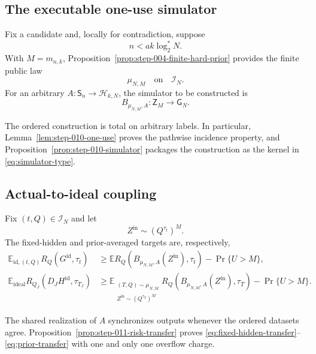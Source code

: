 \subsection{The executable one-use simulator}\label{app:step-010}
Fix a candidate and, locally for contradiction, suppose
\begin{equation}
n<ak\log_2^*N.
\tag{2}\label{eq:local-negation}
\end{equation}
With $M=m_{n,k}$, Proposition~\ref{prop:step-004-finite-hard-prior}
provides the finite public law
\begin{equation}
\mu_{N,M}\quad\text{on}\quad\mathcal I_N.
\tag{3}\label{eq:public-prior}
\end{equation}
For an arbitrary $A:\mathsf S_n\to\mathcal H_{k,N}$, the simulator to be
constructed is
\begin{equation}
B_{\mu_{N,M},A}:\mathsf Z_M\longrightarrow\mathsf G_N.
\tag{5}\label{eq:simulator-type}
\end{equation}

The ordered construction is total on arbitrary labels.  In particular,
Lemma~\ref{lem:step-010-one-use} proves the pathwise incidence property,
and Proposition~\ref{prop:step-010-simulator} packages the construction as
the kernel in \eqref{eq:simulator-type}.

\subsection{Actual-to-ideal coupling}\label{app:step-011}
Fix $(t,Q)\in\mathcal I_N$ and let
\begin{equation}
Z^{\mathrm{in}}\sim(Q^{\tau_t})^M.
\tag{3}\label{eq:coupling-input-law}
\end{equation}
The fixed-hidden and prior-averaged targets are, respectively,
\begin{align}
\mathbb E_{\mathrm{id},(t,Q)}R_Q(G^{\mathrm{id}},\tau_t)
&\ge
\mathbb E R_Q(B_{\mu_{N,M},A}(Z^{\mathrm{in}}),\tau_t)
-\Pr\{U>M\},
\tag{4a}\label{eq:fixed-hidden-transfer}\\
\mathbb E_{\mathrm{ideal}}R_{Q_J}(D_JH^{\mathrm{id}},\tau_{T_J})
&\ge
\mathbb E_{\substack{(T,Q)\sim\mu_{N,M}\\
Z^{\mathrm{in}}\sim(Q^{\tau_T})^M}}
R_Q(B_{\mu_{N,M},A}(Z^{\mathrm{in}}),\tau_T)
-\Pr\{U>M\}.
\tag{4b}\label{eq:prior-transfer}
\end{align}

The shared realization of $A$ synchronizes outputs whenever the ordered
datasets agree.  Proposition~\ref{prop:step-011-risk-transfer} proves
\eqref{eq:fixed-hidden-transfer}--\eqref{eq:prior-transfer} with one and
only one overflow charge.


